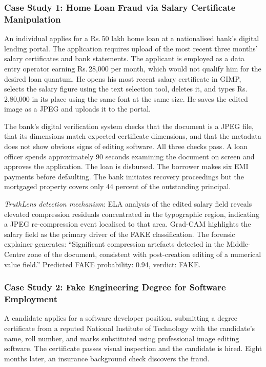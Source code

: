 \documentclass[12pt,a4paper,oneside]{report}
\newcommand{\rupee}{Rs.\,}
\begin{document}
\subsubsection*{Case Study 1: Home Loan Fraud via Salary Certificate Manipulation}

An individual applies for a \rupee 50 lakh home loan at a nationalised bank's
digital lending portal. The application requires upload of the most recent three
months' salary certificates and bank statements. The applicant is employed as
a data entry operator earning \rupee 28,000 per month, which would not qualify
him for the desired loan quantum. He opens his most recent salary certificate
in GIMP, selects the salary figure using the text selection tool, deletes it,
and types \rupee 2,80,000 in its place using the same font at the same size.
He saves the edited image as a JPEG and uploads it to the portal.

The bank's digital verification system checks that the document is a JPEG
file, that its dimensions match expected certificate dimensions, and that
the metadata does not show obvious signs of editing software. All three checks
pass. A loan officer spends approximately 90 seconds examining the document
on screen and approves the application. The loan is disbursed. The borrower
makes six EMI payments before defaulting. The bank initiates recovery
proceedings but the mortgaged property covers only 44 percent of the
outstanding principal.

\textit{TruthLens detection mechanism}: ELA analysis of the edited salary
field reveals elevated compression residuals concentrated in the typographic
region, indicating a JPEG re-compression event localised to that area. Grad-CAM
highlights the salary field as the primary driver of the FAKE classification.
The forensic explainer generates: ``Significant compression artefacts detected
in the Middle-Centre zone of the document, consistent with post-creation editing
of a numerical value field.'' Predicted FAKE probability: 0.94, verdict: FAKE.

\subsubsection*{Case Study 2: Fake Engineering Degree for Software Employment}

A candidate applies for a software developer position, submitting a degree
certificate from a reputed National Institute of Technology with the candidate's
name, roll number, and marks substituted using professional image editing
software. The certificate passes visual inspection and the candidate is hired.
Eight months later, an insurance background check discovers the fraud.
\end{document}
